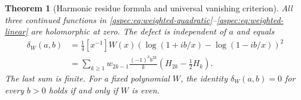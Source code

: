 \documentclass[11pt,letterpaper]{article}
\numberwithin{equation}{section}
\newtheorem{theorem}{Theorem}[section]
\theoremstyle{definition}
\begin{document}
\begin{theorem}[Harmonic residue formula and universal vanishing criterion]
\label{qspec:thm:anomaly}
All three continued functions in
\eqref{qspec:eq:weighted-quadratic}--\eqref{qspec:eq:weighted-linear} are
holomorphic at zero. The defect is independent of $a$ and equals
\begin{align}
\delta_W(a,b)
&=\frac14[x^{-1}]W(x)
\left(\log(1+ib/x)-\log(1-ib/x)\right)^2\label{qspec:eq:anomaly-residue}\\
&=\sum_{k\ge1}w_{2k-1}\frac{(-1)^k b^{2k}}{k}
\left(H_{2k}-\frac12H_k\right).
\label{qspec:eq:anomaly-harmonic}
\end{align}
The last sum is finite. For a fixed polynomial $W$, the identity
$\delta_W(a,b)=0$ for every $b>0$ holds if and only if $W$ is even.
\end{theorem}
\end{document}
